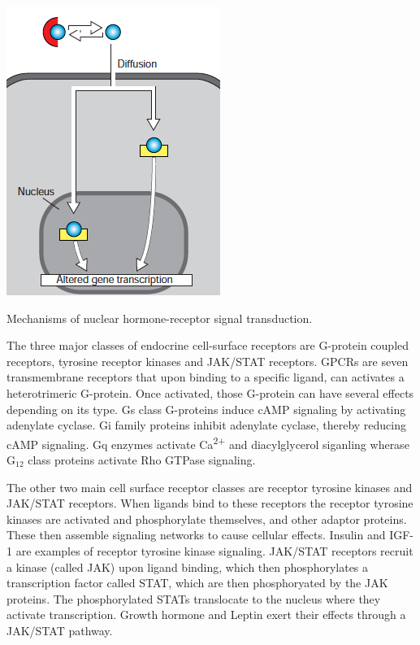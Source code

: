 \documentclass{tufte-handout}
\begin{document}
\begin{marginfigure}[-8cm]
  \includegraphics{figures/nuclear-hormone-receptors}
  \caption{Mechanisms of nuclear hormone-receptor signal transduction.}
    \label{fig:nuclear-hormone-receptors}
\end{marginfigure}

The three major classes of endocrine cell-surface receptors are G-protein coupled receptors, tyrosine receptor kinases and JAK/STAT receptors.  GPCRs are seven transmembrane receptors that upon binding to a specific ligand, can activates a heterotrimeric G-protein.  Once activated, those G-protein can have several effects depending on its type.  Gs class G-proteins induce cAMP signaling by activating adenylate cyclase.  Gi family proteins inhibit adenylate cyclase, thereby reducing cAMP signaling.  Gq enzymes activate Ca\textsuperscript{2+} and diacylglycerol siganling wherase G$_{12}$ class proteins activate Rho GTPase signaling.

The other two main cell surface receptor classes are receptor tyrosine kinases and JAK/STAT receptors.  When ligands bind to these receptors the receptor tyrosine kinases are activated and phosphorylate themselves, and other adaptor proteins.  These then assemble signaling networks to cause cellular effects.  Insulin and IGF-1 are examples of receptor tyrosine kinase signaling.  JAK/STAT receptors recruit a kinase (called JAK) upon ligand binding, which then phosphorylates a transcription factor called STAT, which are then phosphoryated by the JAK proteins.  The phosphorylated STATs translocate to the nucleus where they activate transcription.  Growth hormone and Leptin exert their effects through a JAK/STAT pathway.
\end{document}

